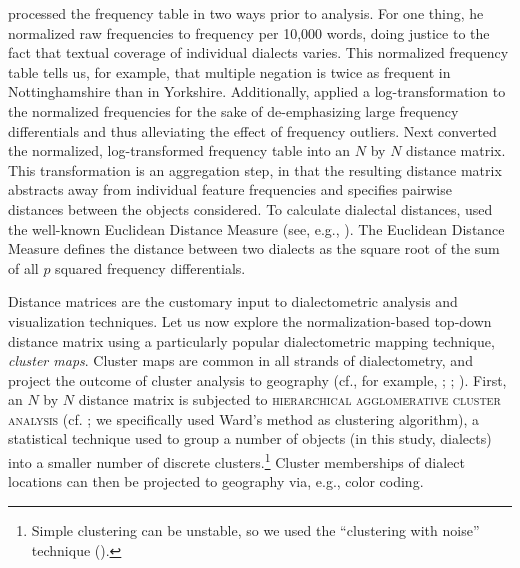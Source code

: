 \documentclass[output=paper]{LSP/langsci}
\begin{document}
\citet{szmrecsanyi_grammatical_2013} processed the frequency table in two ways prior to analysis. For one thing, he normalized raw frequencies to frequency per 10,000 words, doing justice to the fact that textual coverage of individual dialects varies. This normalized frequency table tells us, for example, that multiple negation is twice as frequent in Nottinghamshire than in Yorkshire. Additionally, \citeauthor{szmrecsanyi_grammatical_2013} applied a log-transformation to the normalized frequencies for the sake of de-emphasizing large frequency differentials and thus alleviating the effect of frequency outliers. Next \citeauthor{szmrecsanyi_grammatical_2013} converted the normalized, log-transformed frequency table into an $N$ by $N$ distance matrix. This transformation is an aggregation step, in that the resulting distance matrix abstracts away from individual feature frequencies and specifies pairwise distances between the objects considered. To calculate dialectal distances, \citeauthor{szmrecsanyi_grammatical_2013} used the well-known Euclidean Distance Measure (see, e.g., \citealt[25]{aldenderfer_cluster_1984}). The Euclidean Distance Measure defines the distance between two dialects as the square root of the sum of all $p$ squared frequency differentials.

Distance matrices are the customary input to dialectometric analysis and visualization techniques. Let us now explore the normalization-based top-down distance matrix using a particularly popular dialectometric mapping technique, \emph{cluster maps}. Cluster maps are common in all strands of dialectometry, and project the outcome of cluster analysis to geography (cf., for example, \citealt[Map 18]{goebl_bunch_2007}; \citealt[Figure 5]{nerbonne_dialektklassifikation_2005}; \citealt[Figure 9.6]{heeringa_measuring_2004}). First, an $N$ by $N$ distance matrix is subjected to \textsc{hierarchical agglomerative cluster analysis} (cf. \citealt{jain_data_1999}; we specifically used Ward's method as clustering algorithm), a statistical technique used to group a number of objects (in this study, dialects) into a smaller number of discrete clusters.\footnote{Simple clustering can be unstable, so we used the ``clustering with noise'' technique (\citealt{nerbonne_projecting_2008}).} Cluster memberships of dialect locations can then be projected to geography via, e.g., color coding.
\end{document}
